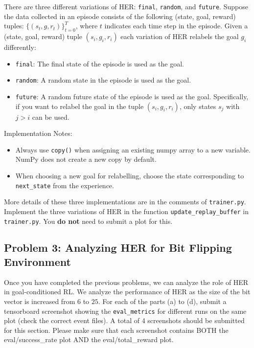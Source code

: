 \documentclass[12pt]{article}
\begin{document}
There are three different variations of HER: \verb|final|, \verb|random|, and \verb|future|. Suppose the data collected in an episode consists of the following (state, goal, reward) tuples: $\{ (s_t, g, r_t) \}_{t=0}^{T}$, where $t$ indicates each time step in the episode. 
Given a (state, goal, reward) tuple $(s_i, g_i, r_i)$ each variation of HER relabels the goal $g_i$ differently:
\begin{itemize}
    \item \verb|final|: The final state of the episode is used as the goal.
    \item \verb|random|: A random state in the episode is used as the goal.
    \item \verb|future|: A random future state of the episode is used as the goal. Specifically, if you want to relabel the goal in the tuple $(s_i, g_i, r_i)$, only states $s_j$ with $j > i$ can be used.
\end{itemize}

Implementation Notes:
\begin{itemize}
    \item Always use \texttt{copy()} when assigning an existing numpy array to a new variable. NumPy does not create a new copy by default.
    \item When choosing a new goal for relabelling, choose the state corresponding to \texttt{next\_state} from the experience.
\end{itemize}
More details of these three implementations are in the comments of \verb|trainer.py|. Implement the three variations of HER in the function \verb|update_replay_buffer| in \texttt{trainer.py}. You \textbf{do not} need to submit a plot for this. 

\subsection*{Problem 3: Analyzing HER for Bit Flipping Environment}
Once you have completed the previous problems, we can analyze the role of HER in goal-conditioned RL. We analyze the performance of HER as the size of the bit vector is increased from $6$ to $25$. For each of the parts (a) to (d), submit a tensorboard screenshot showing the \texttt{eval\_metrics} for different runs on the same plot (check the correct event files). A total of 4 screenshots should be submitted for this section. Please make sure that each screenshot contains BOTH the eval/success\_rate plot AND the eval/total\_reward plot.
\end{document}

